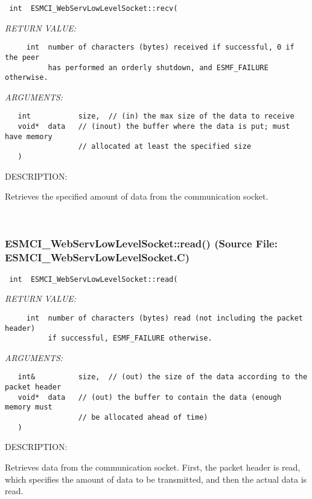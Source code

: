   
\begin{verbatim} int  ESMCI_WebServLowLevelSocket::recv(\end{verbatim}{\em RETURN VALUE:}
\begin{verbatim}     int  number of characters (bytes) received if successful, 0 if the peer
          has performed an orderly shutdown, and ESMF_FAILURE otherwise.\end{verbatim}{\em ARGUMENTS:}
\begin{verbatim}   int           size,  // (in) the max size of the data to receive
   void*  data   // (inout) the buffer where the data is put; must have memory
                 // allocated at least the specified size
   )\end{verbatim}
{\sf DESCRIPTION:\\ }


      Retrieves the specified amount of data from the communication socket.
   
 
\mbox{}\hrulefill\
 
\subsubsection{ESMCI\_WebServLowLevelSocket::read() (Source File: ESMCI\_WebServLowLevelSocket.C)}


  
\begin{verbatim} int  ESMCI_WebServLowLevelSocket::read(\end{verbatim}{\em RETURN VALUE:}
\begin{verbatim}     int  number of characters (bytes) read (not including the packet header)
          if successful, ESMF_FAILURE otherwise.\end{verbatim}{\em ARGUMENTS:}
\begin{verbatim}   int&          size,  // (out) the size of the data according to the packet header
   void*  data   // (out) the buffer to contain the data (enough memory must
                 // be allocated ahead of time)
   )\end{verbatim}
{\sf DESCRIPTION:\\ }


      Retrieves data from the communication socket.  First, the packet header
      is read, which specifies the amount of data to be transmitted, and then
      the actual data is read.
   
